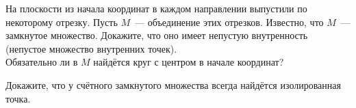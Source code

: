 \documentclass[a4paper, 11pt]{article}
\begin{document}
На плоскости из начала координат в каждом
направлении выпустили по некоторому отрезку.
Пусть $M$~--- объединение этих отрезков.
Известно, что $M$~--- замкнутое множество.
Докажите, что оно имеет непустую внутренность
(непустое множество внутренних точек).\\
Обязательно ли в $M$ найдётся круг
с центром в начале координат?

Докажите, что у счётного замкнутого множества всегда найдётся
изолированная точка.

\vfill
{}
\end{document}
